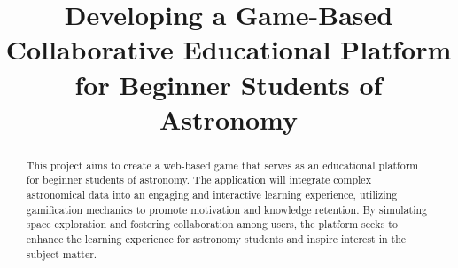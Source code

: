 \documentclass[oneside]{etd}
\title{Developing a Game-Based Collaborative Educational Platform for Beginner Students of Astronomy
}
\begin{document}
\maketitle
\makerecomm
\makeacceptance
\makedeclaration


\begin{abstract}
	This project aims to create a web-based game that serves as an educational platform for beginner students of astronomy. The application will integrate complex astronomical data into an engaging and interactive learning experience, utilizing gamification mechanics to promote motivation and knowledge retention. By simulating space exploration and fostering collaboration among users, the platform seeks to enhance the learning experience for astronomy students and inspire interest in the subject matter.
\end{abstract}




\begingroup
\renewcommand*{\addvspace}[1]{}
\tableofcontents
\listoffigures
\listoftables
\endgroup

\beginbody
{}





%
%

\appendix
%    
%    
%    
%    

\nocite{*}

{
\singlespace

}


\end{document}
